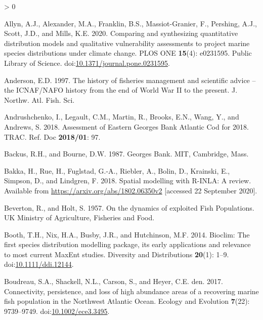 \documentclass[
]{article}
\newlength{\cslhangindent}
\newenvironment{CSLReferences}[2] %
 {%
  \setlength{\parindent}{0pt}
  \ifodd #1 \everypar{\setlength{\hangindent}{\cslhangindent}}\ignorespaces\fi
  \ifnum #2 > 0
  \setlength{\parskip}{#2\baselineskip}
  \fi
 }%
 {}
\begin{document}
\hypertarget{refs}{}
\begin{CSLReferences}{1}{0}
\leavevmode\hypertarget{ref-allynComparingSynthesizingQuantitative2020}{}%
Allyn, A.J., Alexander, M.A., Franklin, B.S., Massiot-Granier, F., Pershing, A.J., Scott, J.D., and Mills, K.E. 2020. Comparing and synthesizing quantitative distribution models and qualitative vulnerability assessments to project marine species distributions under climate change. PLOS ONE \textbf{15}(4): e0231595. {Public Library of Science}. doi:\href{https://doi.org/10.1371/journal.pone.0231595}{10.1371/journal.pone.0231595}.

\leavevmode\hypertarget{ref-andersonHistoryFisheriesManagement1997}{}%
Anderson, E.D. 1997. The history of fisheries management and scientific advice -- the {ICNAF}/{NAFO} history from the end of {World War II} to the present. J. Northw. Atl. Fish. Sci.

\leavevmode\hypertarget{ref-andrushchenkoAssessmentEasternGeorges2018}{}%
Andrushchenko, I., Legault, C.M., Martin, R., Brooks, E.N., Wang, Y., and Andrews, S. 2018. Assessment of {Eastern Georges Bank Atlantic Cod} for 2018. TRAC. Ref. Doc \textbf{2018/01}: 97.

\leavevmode\hypertarget{ref-backusGeorgesBank1987}{}%
Backus, R.H., and Bourne, D.W. 1987. Georges {Bank}. {MIT}, {Cambridge, Mass}.

\leavevmode\hypertarget{ref-bakkaSpatialModellingRINLA2018}{}%
Bakka, H., Rue, H., Fuglstad, G.-A., Riebler, A., Bolin, D., Krainski, E., Simpson, D., and Lindgren, F. 2018. Spatial modelling with {R}-{INLA}: {A} review. Available from \url{https://arxiv.org/abs/1802.06350v2} {[}accessed 22 September 2020{]}.

\leavevmode\hypertarget{ref-bevertonDynamicsExploitedFish1957}{}%
Beverton, R., and Holt, S. 1957. On the dynamics of exploited {Fish Populations}. {UK Ministry of Agriculture, Fisheries and Food}.

\leavevmode\hypertarget{ref-boothBioclimFirstSpecies2014}{}%
Booth, T.H., Nix, H.A., Busby, J.R., and Hutchinson, M.F. 2014. Bioclim: The first species distribution modelling package, its early applications and relevance to most current {MaxEnt} studies. Diversity and Distributions \textbf{20}(1): 1--9. doi:\href{https://doi.org/10.1111/ddi.12144}{10.1111/ddi.12144}.

\leavevmode\hypertarget{ref-boudreauConnectivityPersistenceLoss2017}{}%
Boudreau, S.A., Shackell, N.L., Carson, S., and Heyer, C.E. den. 2017. Connectivity, persistence, and loss of high abundance areas of a recovering marine fish population in the {Northwest Atlantic Ocean}. Ecology and Evolution \textbf{7}(22): 9739--9749. doi:\href{https://doi.org/10.1002/ece3.3495}{10.1002/ece3.3495}.


\end{CSLReferences}
\end{document}
